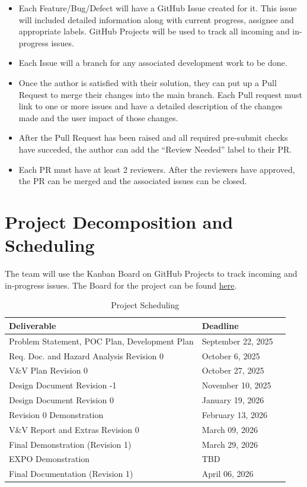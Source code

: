 \documentclass{article}
\begin{document}
\begin{itemize}
  \item Each Feature/Bug/Defect will have a GitHub Issue created for it. This issue will included detailed information along with current progress, assignee and appropriate labels. GitHub Projects will be used to track all incoming and in-progress issues.
	\item Each Issue will a branch for any associated development work to be done.
	\item Once the author is satisfied with their solution, they can put up a Pull Request to merge their changes into the main branch. Each Pull request must link to one or more issues and have a detailed description of the changes made and the user impact of those changes.
	\item After the Pull Request has been raised and all required pre-submit checks have succeded, the author can add the ``Review Needed'' label to their PR.
	\item Each PR must have at least 2 reviewers. After the reviewers have approved, the PR can be merged and the associated issues can be closed.
\end{itemize}

\section{Project Decomposition and Scheduling}

The team will use the Kanban Board on GitHub Projects to track incoming and in-progress issues.
The Board for the project can be found \href{https://github.com/users/gkpodder/projects/2}{here}.


\begin{table}[!h]
\caption{Project Scheduling} \label{ProjScheduling}
\begin{tabularx}{\textwidth}{lXl}
\toprule
\textbf{Deliverable} & \textbf{Deadline} \\
\midrule
Problem Statement, POC Plan, Development Plan & September 22, 2025\\
Req. Doc. and Hazard Analysis Revision 0 & October 6, 2025 \\
V\&V Plan Revision 0 & October 27, 2025 \\
Design Document Revision -1 & November 10, 2025 \\
Design Document Revision 0 & January 19, 2026 \\
Revision 0 Demonstration &  February 13, 2026\\
V\&V Report and Extras Revision 0 & March 09, 2026 \\
Final Demonstration (Revision 1)  &  March 29, 2026 \\
EXPO Demonstration & TBD \\
Final Documentation (Revision 1) & April 06, 2026 \\
\bottomrule
\end{tabularx}
\end{table}
\end{document}
